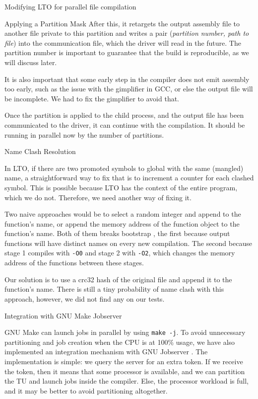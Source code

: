 \begin{section}{Modifying LTO for parallel file compilation}
\begin{subsection}{Applying a Partition Mask}
After this, it retargets the output assembly file to another file private to
this partition and writes a pair (\textit{partition number, path to file}) into the
communication file, which the driver will read in the future. The partition
number is important to guarantee that the build is reproducible, as we will
discuss later.

It is also important that some early step in the compiler does not emit assembly
too early, such as the issue with the gimplifier in GCC, or else the output
file will be incomplete. We had to fix the gimplifier to avoid that.

Once the partition is applied to the child process, and the output file has
been communicated to the driver, it can continue with the compilation. It
should be running in parallel now by the number of partitions.

\end{subsection}

\begin{subsection}{Name Clash Resolution}\label{sec:name_clash_resolution}

In LTO, if there are two promoted symbols to global with the same (mangled) name, a
straightforward way to fix that is to increment a counter for each clashed
symbol. This is possible because LTO has the context of the entire program,
which we do not. Therefore, we need another way of fixing it.

Two naive approaches would be to select a random integer and append to the
function's name, or append the memory address of the function object to the
function's name.  Both of them breaks bootstrap \citep{bootstrap}, the first
because output functions will have distinct names on every new compilation. The
second because stage 1 compiles with \texttt{-O0} and stage 2 with
\texttt{-O2}, which changes the memory address of the functions between these stages.

Our solution is to use a crc32 hash of the original file and append it to the
function's name.  There is still a tiny probability of name clash with this
approach, however, we did not find any on our tests.

\end{subsection}

\begin{subsection}{Integration with GNU Make Jobserver}\label{sec:integration_jobserver}

GNU Make can launch jobs in parallel by using \texttt{make -j}.  To
avoid unnecessary partitioning and job creation when the CPU is at 100\% usage,
we have also implemented an integration mechanism with GNU Jobserver
\citep{posixjobserver}.  The implementation is simple: we query the server for
an extra token. If we receive the token, then it means that some processor is
available, and we can partition the TU and launch jobs inside the compiler.
Else, the processor workload is full, and it may be better to avoid
partitioning altogether.


\end{subsection}
\end{section}
